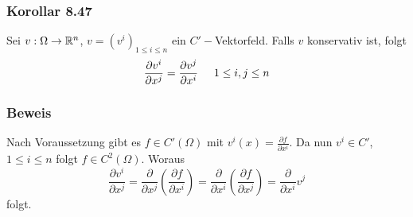 \subsubsection*{Korollar 8.47}
Sei $v:\Omega\to\mathbb{R}^n$, $v={\left( v^i\right)}_{1\leq i \leq n}$ ein $C'-$Vektorfeld. Falls $v$ konservativ ist, folgt
\[\frac{{\partial {v^i}}}{{\partial {x^j}}} = \frac{{\partial {v^j}}}{{\partial {x^i}}}\hspace{5mm}1 \le i,j \le n\]

\subsubsection*{Beweis}
Nach Voraussetzung gibt es $f\in C'\left( \Omega\right)$ mit $v^i(x)=\frac{\partial f}{\partial x^i}$. Da nun $v^i \in C'$, $1\leq i\leq n$ folgt $f\in C^2\left( \Omega\right)$. Woraus
\[\frac{{\partial {v^i}}}{{\partial {x^j}}} = \frac{\partial }{{\partial {x^j}}}\left( {\frac{{\partial f}}{{\partial {x^i}}}} \right) = \frac{\partial }{{\partial {x^i}}}\left( {\frac{{\partial f}}{{\partial {x^j}}}} \right) = \frac{\partial }{{\partial {x^i}}}{v^j}\]
folgt.

